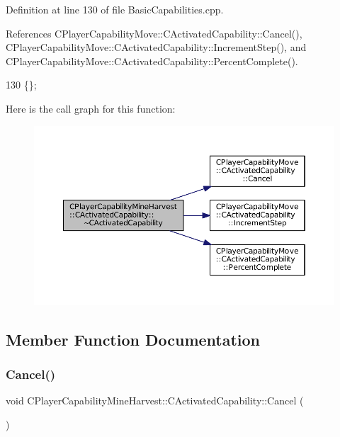 Definition at line 130 of file Basic\+Capabilities.\+cpp.



References C\+Player\+Capability\+Move\+::\+C\+Activated\+Capability\+::\+Cancel(), C\+Player\+Capability\+Move\+::\+C\+Activated\+Capability\+::\+Increment\+Step(), and C\+Player\+Capability\+Move\+::\+C\+Activated\+Capability\+::\+Percent\+Complete().


\begin{DoxyCode}
130 \{\};
\end{DoxyCode}
Here is the call graph for this function\+:\nopagebreak
\begin{figure}[H]
\begin{center}
\leavevmode
\includegraphics[width=350pt]{classCPlayerCapabilityMineHarvest_1_1CActivatedCapability_a206562e670341a6eb24d0c5dc1bea976_cgraph}
\end{center}
\end{figure}


\subsection{Member Function Documentation}
\hypertarget{classCPlayerCapabilityMineHarvest_1_1CActivatedCapability_ab1fef064fbc085a6419b5a822e787614}{}\label{classCPlayerCapabilityMineHarvest_1_1CActivatedCapability_ab1fef064fbc085a6419b5a822e787614} 
\subsubsection{\texorpdfstring{Cancel()}{Cancel()}}
{\footnotesize\ttfamily void C\+Player\+Capability\+Mine\+Harvest\+::\+C\+Activated\+Capability\+::\+Cancel (\begin{DoxyParamCaption}{ }\end{DoxyParamCaption})\hspace{0.3cm}{\ttfamily [virtual]}}




